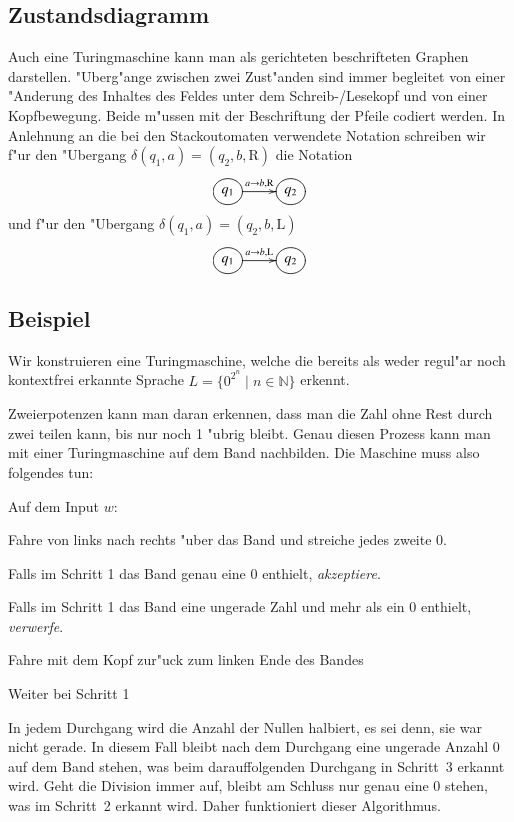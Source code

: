 \subsection{Zustandsdiagramm}
Auch eine Turingmaschine kann man als gerichteten beschrifteten Graphen
darstellen. "Uberg"ange zwischen zwei Zust"anden sind immer begleitet von
einer "Anderung des Inhaltes des Feldes unter dem Schreib-/Lesekopf
und von einer Kopfbewegung. Beide m"ussen mit der Beschriftung
der Pfeile codiert werden. In Anlehnung an die bei den Stackoutomaten
verwendete Notation schreiben wir f"ur den "Ubergang
$\delta(q_1,a)=(q_2,b,\text{R})$
die Notation
\[
\entrymodifiers={++[o][F]}
\xymatrix{
{q_1}\ar[r]^{a\to b,\text{R}}
	&{q_2}
}
\]
und f"ur den "Ubergang
$\delta(q_1,a)=(q_2,b,\text{L})$
\[
\entrymodifiers={++[o][F]}
\xymatrix{
{q_1}\ar[r]^{a\to b,\text{L}}
	&{q_2}
}
\]

\subsection{Beispiel}
Wir konstruieren eine Turingmaschine, welche die bereits als weder regul"ar
noch kontextfrei erkannte Sprache $L=\{0^{2^n}\;|\; n\in\mathbb N\}$
erkennt.

Zweierpotenzen kann man daran erkennen, dass man die Zahl ohne
Rest durch zwei teilen kann, bis nur noch 1 "ubrig bleibt. Genau
diesen Prozess kann man mit einer Turingmaschine auf dem Band
nachbilden. Die Maschine muss also folgendes tun:

Auf dem Input $w$:
\begin{compactenum}
\item Fahre von links nach rechts "uber das Band und streiche jedes zweite $0$.
\item Falls im Schritt 1 das Band genau eine $0$ enthielt, {\it akzeptiere}.
\item Falls im Schritt 1 das Band eine ungerade Zahl und mehr als ein $0$
enthielt, {\it verwerfe}.
\item Fahre mit dem Kopf zur"uck zum linken Ende des Bandes
\item Weiter bei Schritt 1
\end{compactenum}
In jedem Durchgang wird die Anzahl der Nullen halbiert, es sei denn,
sie war nicht gerade. In diesem Fall bleibt nach dem Durchgang eine
ungerade Anzahl $0$ auf dem Band stehen, was beim darauffolgenden Durchgang
in Schritt~3 erkannt wird. Geht die Division immer auf, bleibt am Schluss
nur genau eine $0$ stehen, was im Schritt~2 erkannt wird. Daher funktioniert
dieser Algorithmus.

